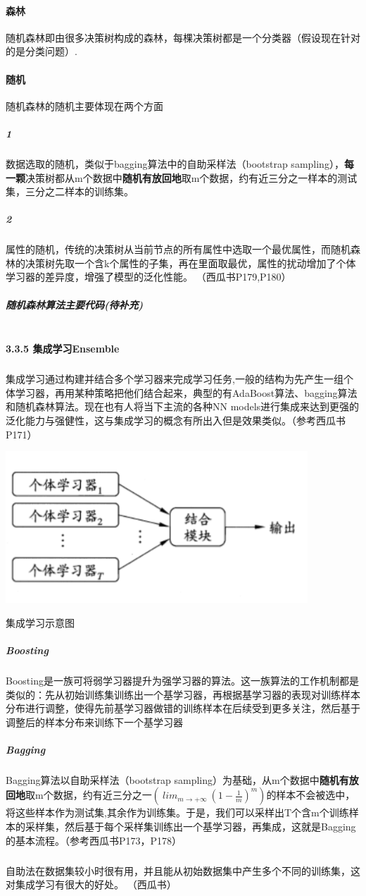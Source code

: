 \documentclass[UTF8]{article}
\begin{document}
 \paragraph{森林}随机森林即由很多决策树构成的森林，每棵决策树都是一个分类器（假设现在针对的是分类问题）.
 \paragraph{随机}随机森林的随机主要体现在两个方面
 \subparagraph{1}数据选取的随机，类似于bagging算法中的自助采样法（bootstrap sampling），\textbf{每一颗}决策树都从m个数据中\textbf{随机有放回地}取m个数据，约有近三分之一样本的测试集，三分之二样本的训练集。
 \subparagraph{2}属性的随机，传统的决策树从当前节点的所有属性中选取一个最优属性，而随机森林的决策树先取一个含k个属性的子集，再在里面取最优，属性的扰动增加了个体学习器的差异度，增强了模型的泛化性能。
 （西瓜书P179,P180）




 \subparagraph{随机森林算法主要代码(待补充)}

 \lstset{language=python}
 \begin{lstlisting}
 \end{lstlisting}

\paragraph{\large 3.3.5 集成学习Ensemble}
\subparagraph{}
集成学习通过构建并结合多个学习器来完成学习任务,一般的结构为先产生一组个体学习器，再用某种策略把他们结合起来，典型的有AdaBoost算法、bagging算法和随机森林算法。现在也有人将当下主流的各种NN models进行集成来达到更强的泛化能力与强健性，这与集成学习的概念有所出入但是效果类似。（参考西瓜书P171）
\begin{center}
\includegraphics[width=0.8\linewidth]{5.PNG}
\end{center}
\centerline{集成学习示意图}
\subparagraph{Boosting}Boosting是一族可将弱学习器提升为强学习器的算法。这一族算法的工作机制都是类似的：先从初始训练集训练出一个基学习器，再根据基学习器的表现对训练样本分布进行调整，使得先前基学习器做错的训练样本在后续受到更多关注，然后基于调整后的样本分布来训练下一个基学习器
\subparagraph{Bagging}Bagging算法以自助采样法（bootstrap sampling）为基础，从m个数据中\textbf{随机有放回地}取m个数据，约有近三分之一$(\ lim_ {m \to + \infty} \ (1 - \frac{1}{m})^m)$的样本不会被选中，将这些样本作为测试集,其余作为训练集。于是，我们可以采样出T个含m个训练样本的采样集，然后基于每个采样集训练出一个基学习器，再集成，这就是Bagging的基本流程。（参考西瓜书P173，P178）
\subparagraph{}自助法在数据集较小时很有用，并且能从初始数据集中产生多个不同的训练集，这对集成学习有很大的好处。 （西瓜书）
\end{document}
